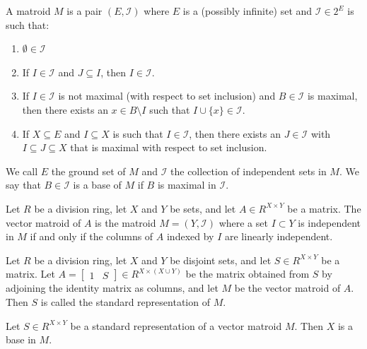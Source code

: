 \begin{definition}
    \label{Matroid}
    \leanok
    A matroid $M$ is a pair $(E, \mathcal{I})$ where $E$ is a (possibly infinite) set and $\mathcal I \in 2^E$ is such that:
    \begin{enumerate}
        \item $\emptyset \in \mathcal I$
        \item If $I \in \mathcal I$ and $J \subseteq I$, then $I \in \mathcal I$.
        \item If $I \in \mathcal I$ is not maximal (with respect to set inclusion) and $B \in \mathcal I$ is maximal,
            then there exists an $x \in B \setminus I$ such that $I \cup \{x\} \in \mathcal{I}$.
        \item If $X \subseteq E$ and $I \subseteq X$ is such that $I \in \mathcal I$, then there exists an $J \in \mathcal I$ with $I \subseteq J \subseteq X$
            that is maximal with respect to set inclusion.
    \end{enumerate}
    We call $E$ the ground set of $M$ and $\mathcal{I}$ the collection of independent sets in $M$. We say that $B \in \mathcal I$ is a base of $M$ if $B$ is maximal in $\mathcal I$.
\end{definition}

\begin{definition}
    \label{VectorMatroid}
    \leanok
    Let $R$ be a division ring, let $X$ and $Y$ be sets, and let $A \in R^{X \times Y}$ be a matrix. The vector matroid of $A$ is the matroid $M = (Y, \mathcal{I})$ where a set $I \subset Y$ is independent in $M$ if and only if the columns of $A$ indexed by $I$ are linearly independent.
\end{definition}

\begin{definition}
    \label{StandardRepr}
    \leanok
    Let $R$ be a division ring, let $X$ and $Y$ be disjoint sets, and let $S \in R^{X \times Y}$ be a matrix. Let $A = \begin{bmatrix} 1 & S \end{bmatrix} \in R^{X \times (X \cup Y)}$ be the matrix obtained from $S$ by adjoining the identity matrix as columns, and let $M$ be the vector matroid of $A$. Then $S$ is called the standard representation of $M$.
\end{definition}

\begin{lemma}
    \label{StandardRepr.toMatroid_isBase_X}
    \leanok
    Let $S \in R^{X \times Y}$ be a standard representation of a vector matroid $M$. Then $X$ is a base in $M$.
\end{lemma}

